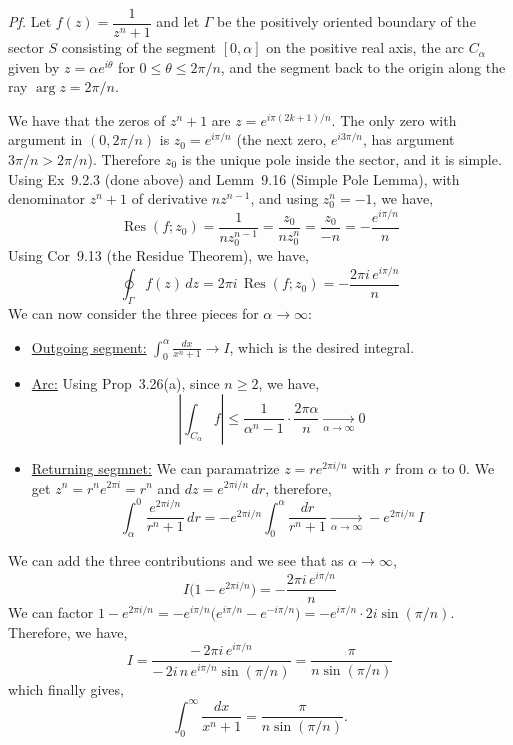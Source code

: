 \documentclass[a4paper]{article}
\DeclareMathOperator{\Res}{Res}
\begin{document}
\textit{Pf.} Let $f(z)=\dfrac{1}{z^n+1}$ and let $\Gamma$ be the positively oriented boundary
of the sector $S$ consisting of the segment $[0,\alpha]$ on the positive real axis, the arc
$C_\alpha$ given by $z=\alpha e^{i\theta}$ for $0\le\theta\le 2\pi/n$, and the
segment back to the origin along the ray $\arg z=2\pi/n$.

\medskip
We have that the zeros of $z^n+1$ are $z=e^{i\pi(2k+1)/n}$. The only zero with argument in
$(0,2\pi/n)$ is $z_0=e^{i\pi/n}$ (the next zero, $e^{i3\pi/n}$, has argument $3\pi/n>2\pi/n$). Therefore $z_0$ is the unique pole inside the sector, and it is
simple. Using Ex~9.2.3 (done above) and Lemm~9.16 (Simple Pole Lemma), with denominator
$z^n+1$ of derivative $nz^{n-1}$, and using $z_0^n=-1$, we have,
\[
\Res(f;z_0)=\frac{1}{nz_0^{n-1}}=\frac{z_0}{nz_0^{n}}=\frac{z_0}{-n}
=-\frac{e^{i\pi/n}}{n}
\]
Using Cor~9.13 (the Residue Theorem), we have,
\[
\oint_{\Gamma}f(z)\,dz=2\pi i\,\Res(f;z_0)=-\frac{2\pi i\,e^{i\pi/n}}{n}
\]
We can now consider the three pieces for $\alpha\to\infty$:

\begin{itemize}
    \item \underline{Outgoing segment:} $\displaystyle\int_{0}^{\alpha}\frac{dx}{x^n+1}\to I$, which is the desired integral.

    \item \underline{Arc:} Using Prop~3.26(a), since $n\ge 2$, we have,
    \[
    \left|\int_{C_\alpha}f\right|\le\frac{1}{\alpha^n-1}\cdot\frac{2\pi\alpha}{n}
    \xrightarrow[\alpha\to\infty]{}0
    \]

    \item \underline{Returning segmnet:} We can paramatrize $z=re^{2\pi i/n}$ with $r$ from $\alpha$ to
    $0$. We get $z^n=r^n e^{2\pi i}=r^n$ and $dz=e^{2\pi i/n}\,dr$, therefore,
    \[
    \int_{\alpha}^{0}\frac{e^{2\pi i/n}}{r^n+1}\,dr
    =-e^{2\pi i/n}\int_{0}^{\alpha}\frac{dr}{r^n+1}
    \xrightarrow[\alpha\to\infty]{}-e^{2\pi i/n}\,I
    \]
\end{itemize}

We can add the three contributions and we see that as $\alpha\to\infty$,
\[
I\bigl(1-e^{2\pi i/n}\bigr)=-\frac{2\pi i\,e^{i\pi/n}}{n}
\]
We can factor $1-e^{2\pi i/n}=-e^{i\pi/n}\bigl(e^{i\pi/n}-e^{-i\pi/n}\bigr)
=-e^{i\pi/n}\cdot 2i\sin(\pi/n)$. Therefore, we have,
\[
I=\frac{-\,2\pi i\,e^{i\pi/n}}{-\,2i\,n\,e^{i\pi/n}\sin(\pi/n)}
=\frac{\pi}{n\sin(\pi/n)}
\]
which finally gives,
\[
\int_{0}^{\infty}\frac{dx}{x^n+1}=\frac{\pi}{n\sin(\pi/n)}.
\]
\end{document}
